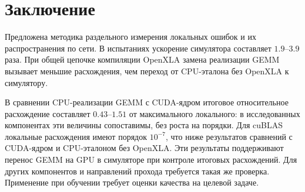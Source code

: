\section{Заключение}
\label{sec:conclusion}

Предложена методика раздельного измерения локальных ошибок
и их распространения по сети. В испытаниях ускорение симулятора
составляет $1.9$--$3.9$ раза. При общей цепочке компиляции OpenXLA
замена реализации GEMM вызывает меньшие расхождения, чем переход
от CPU-эталона без OpenXLA к симулятору.

В сравнении CPU-реализации GEMM с CUDA-ядром итоговое относительное
расхождение составляет $0.43$--$1.51$ от максимального локального:
в исследованных компонентах эти величины сопоставимы, без роста
на порядки. Для cuBLAS локальные расхождения имеют порядок $10^{-7}$,
что ниже результатов сравнений с CUDA-ядром и CPU-эталоном без OpenXLA.
Эти результаты поддерживают перенос GEMM на GPU в симуляторе
при контроле итоговых расхождений. Для других компонентов и направлений
прохода требуется такая же проверка. Применение при обучении требует
оценки качества на целевой задаче.
